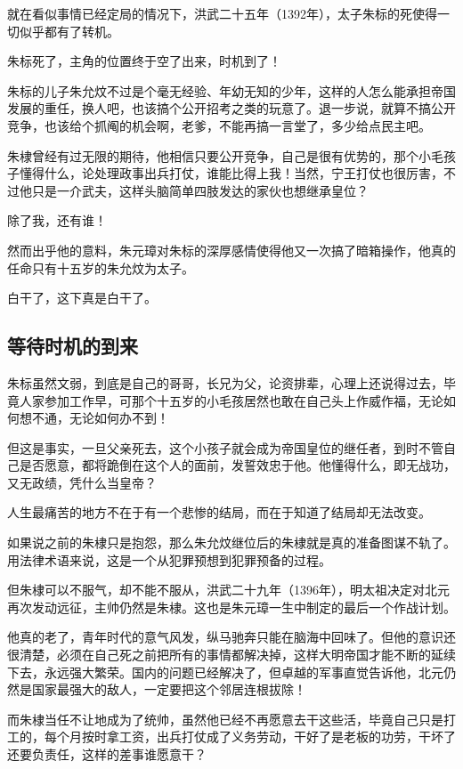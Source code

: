 \begin{multicols}{\theparacolNo}
		就在看似事情已经定局的情况下，洪武二十五年（1392年），太子朱标的死使得一切似乎都有了转机。

		朱标死了，主角的位置终于空了出来，时机到了！

		朱标的儿子朱允炆不过是个毫无经验、年幼无知的少年，这样的人怎么能承担帝国发展的重任，换人吧，也该搞个公开招考之类的玩意了。退一步说，就算不搞公开竞争，也该给个抓阄的机会啊，老爹，不能再搞一言堂了，多少给点民主吧。

		朱棣曾经有过无限的期待，他相信只要公开竞争，自己是很有优势的，那个小毛孩子懂得什么，论处理政事出兵打仗，谁能比得上我！当然，宁王打仗也很厉害，不过他只是一介武夫，这样头脑简单四肢发达的家伙也想继承皇位？

		除了我，还有谁！

		然而出乎他的意料，朱元璋对朱标的深厚感情使得他又一次搞了暗箱操作，他真的任命只有十五岁的朱允炆为太子。

		白干了，这下真是白干了。

		\subsection{等待时机的到来}
		朱标虽然文弱，到底是自己的哥哥，长兄为父，论资排辈，心理上还说得过去，毕竟人家参加工作早，可那个十五岁的小毛孩居然也敢在自己头上作威作福，无论如何想不通，无论如何办不到！

		但这是事实，一旦父亲死去，这个小孩子就会成为帝国皇位的继任者，到时不管自己是否愿意，都将跪倒在这个人的面前，发誓效忠于他。他懂得什么，即无战功，又无政绩，凭什么当皇帝？

		人生最痛苦的地方不在于有一个悲惨的结局，而在于知道了结局却无法改变。

		如果说之前的朱棣只是抱怨，那么朱允炆继位后的朱棣就是真的准备图谋不轨了。用法律术语来说，这是一个从犯罪预想到犯罪预备的过程。

		但朱棣可以不服气，却不能不服从，洪武二十九年（1396年），明太祖决定对北元再次发动远征，主帅仍然是朱棣。这也是朱元璋一生中制定的最后一个作战计划。

		他真的老了，青年时代的意气风发，纵马驰奔只能在脑海中回味了。但他的意识还很清楚，必须在自己死之前把所有的事情都解决掉，这样大明帝国才能不断的延续下去，永远强大繁荣。国内的问题已经解决了，但卓越的军事直觉告诉他，北元仍然是国家最强大的敌人，一定要把这个邻居连根拔除！

		而朱棣当任不让地成为了统帅，虽然他已经不再愿意去干这些活，毕竟自己只是打工的，每个月按时拿工资，出兵打仗成了义务劳动，干好了是老板的功劳，干坏了还要负责任，这样的差事谁愿意干？


\end{multicols}

